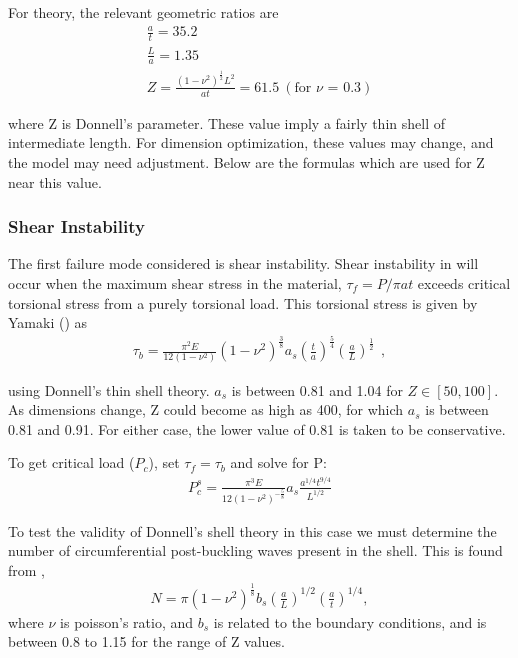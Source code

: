 \documentclass{report}
\begin{document}
For theory, the relevant geometric ratios are
\begin{eqnarray}
\frac{a}{t} = 35.2 \\
\frac{L}{a} = 1.35 \\
Z = \frac{(1-\nu^2)^\frac{1}{2}L^2}{at} = 61.5 \ (\text{for $\nu$ = 0.3})
\end{eqnarray}

where Z is Donnell's parameter. These value imply a fairly thin shell of intermediate length. For dimension optimization, these values may change, and the model may need adjustment. Below are the formulas which are used for Z near this value.

\subsubsection{Shear Instability}

The first failure mode considered is shear instability. Shear instability in will occur when the maximum shear stress in the material, $\tau_{f} = P/\pi at$ exceeds critical torsional stress from a purely torsional load. This torsional stress is given by Yamaki (\cite{Yamaki1984}) as
\begin{eqnarray}
\tau_{b} = \frac{\pi^2E}{12(1-\nu^2)}(1-\nu^2)^{\frac{3}{8}}a_s\left(\frac{t}{a}\right)^{\frac{5}{4}}\left(\frac{a}{L}\right)^{\frac{1}{2}}~~,
\end{eqnarray}

using Donnell's thin shell theory. $a_{s}$ is between 0.81 and 1.04 for $Z \in [50,100]$. As dimensions change, Z could become as high as 400, for which $a_{s}$ is between 0.81 and 0.91. For either case, the lower value of 0.81 is taken to be conservative.

To get critical load ($P_{c}$), set $\tau_{f} = \tau_{b}$ and solve for P:
\begin{eqnarray}
P_{c}^{s} = \frac{\pi^3E}{12(1-\nu^2)^{-\frac{5}{8}}}a_{s}\frac{a^{1/4}t^{9/4}}{L^{1/2}}
\end{eqnarray}

To test the validity of Donnell's shell theory in this case we must determine the number of circumferential post-buckling waves present in the shell. This is found from \cite{Yamaki1984},
\begin{eqnarray}
N = \pi(1-\nu^2)^{\frac{1}{8}}b_{s}\left(\frac{a}{L}\right)^{1/2}\left(\frac{a}{t}\right)^{1/4},
\end{eqnarray}
where $\nu$ is poisson's ratio, and $b_{s}$ is related to the boundary conditions, and is between 0.8 to 1.15 for the range of Z values.
\end{document}

